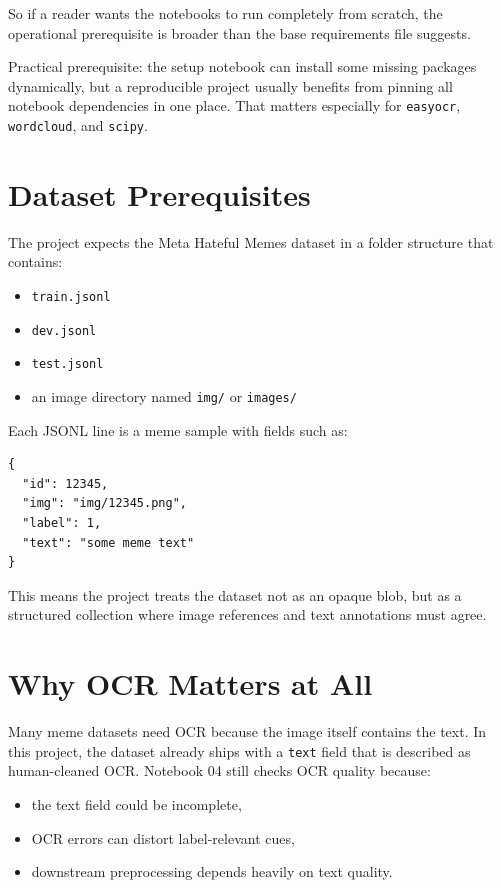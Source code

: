 \documentclass[11pt,a4paper]{report}
\begin{document}
So if a reader wants the notebooks to run completely from scratch, the operational prerequisite is broader than the base requirements file suggests.

\begin{warningbox}
Practical prerequisite: the setup notebook can install some missing packages dynamically, but a reproducible project usually benefits from pinning all notebook dependencies in one place. That matters especially for \texttt{easyocr}, \texttt{wordcloud}, and \texttt{scipy}.
\end{warningbox}

\section{Dataset Prerequisites}

The project expects the Meta Hateful Memes dataset in a folder structure that contains:

\begin{itemize}
\item \texttt{train.jsonl}
\item \texttt{dev.jsonl}
\item \texttt{test.jsonl}
\item an image directory named \texttt{img/} or \texttt{images/}
\end{itemize}

Each JSONL line is a meme sample with fields such as:

\begin{lstlisting}
{
  "id": 12345,
  "img": "img/12345.png",
  "label": 1,
  "text": "some meme text"
}
\end{lstlisting}

This means the project treats the dataset not as an opaque blob, but as a structured collection where image references and text annotations must agree.

\section{Why OCR Matters at All}

Many meme datasets need OCR because the image itself contains the text. In this project, the dataset already ships with a \texttt{text} field that is described as human-cleaned OCR. Notebook 04 still checks OCR quality because:

\begin{itemize}
\item the text field could be incomplete,
\item OCR errors can distort label-relevant cues,
\item downstream preprocessing depends heavily on text quality.
\end{itemize}
\end{document}
